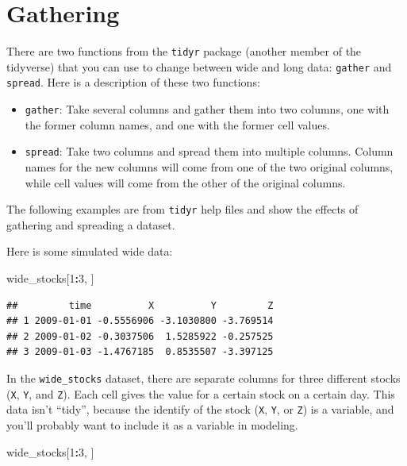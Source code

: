 \documentclass[]{book}
\makeatletter
\newenvironment{Shaded}{\begin{snugshade}}{\end{snugshade}}
\newcommand{\DecValTok}[1]{\textcolor[rgb]{0.00,0.00,0.81}{#1}}
\newcommand{\OperatorTok}[1]{\textcolor[rgb]{0.81,0.36,0.00}{\textbf{#1}}}
\newcommand{\NormalTok}[1]{#1}
\providecommand{\tightlist}{%
  \setlength{\itemsep}{0pt}\setlength{\parskip}{0pt}}
\newenvironment{kframe}{%
\medskip{}
\setlength{\fboxsep}{.8em}
 \def\at@end@of@kframe{}%
 \ifinner\ifhmode%
  \def\at@end@of@kframe{\end{minipage}}%
  \begin{minipage}{\columnwidth}%
 \fi\fi%
 \def\FrameCommand##1{\hskip\@totalleftmargin \hskip-\fboxsep
 \colorbox{shadecolor}{##1}\hskip-\fboxsep
     \hskip-\linewidth \hskip-\@totalleftmargin \hskip\columnwidth}%
 \MakeFramed {\advance\hsize-\width
   \@totalleftmargin\z@ \linewidth\hsize
   \@setminipage}}%
 {\par\unskip\endMakeFramed%
 \at@end@of@kframe}
\renewenvironment{Shaded}{\begin{kframe}}{\end{kframe}}
\theoremstyle{definition}
\theoremstyle{definition}
\theoremstyle{definition}
\theoremstyle{remark}
\makeatother
\begin{document}
\section{Gathering}\label{gathering}

There are two functions from the \texttt{tidyr} package (another member
of the tidyverse) that you can use to change between wide and long data:
\texttt{gather} and \texttt{spread}. Here is a description of these two
functions:

\begin{itemize}
\tightlist
\item
  \texttt{gather}: Take several columns and gather them into two
  columns, one with the former column names, and one with the former
  cell values.
\item
  \texttt{spread}: Take two columns and spread them into multiple
  columns. Column names for the new columns will come from one of the
  two original columns, while cell values will come from the other of
  the original columns.
\end{itemize}

The following examples are from \texttt{tidyr} help files and show the
effects of gathering and spreading a dataset.

Here is some simulated wide data:

\begin{Shaded}
\begin{Highlighting}[]
\NormalTok{wide_stocks[}\DecValTok{1}\OperatorTok{:}\DecValTok{3}\NormalTok{, ]}
\end{Highlighting}
\end{Shaded}

\begin{verbatim}
##         time          X          Y         Z
## 1 2009-01-01 -0.5556906 -3.1030800 -3.769514
## 2 2009-01-02 -0.3037506  1.5285922 -0.257525
## 3 2009-01-03 -1.4767185  0.8535507 -3.397125
\end{verbatim}

In the \texttt{wide\_stocks} dataset, there are separate columns for
three different stocks (\texttt{X}, \texttt{Y}, and \texttt{Z}). Each
cell gives the value for a certain stock on a certain day. This data
isn't ``tidy'', because the identify of the stock (\texttt{X},
\texttt{Y}, or \texttt{Z}) is a variable, and you'll probably want to
include it as a variable in modeling.

\begin{Shaded}
\begin{Highlighting}[]
\NormalTok{wide_stocks[}\DecValTok{1}\OperatorTok{:}\DecValTok{3}\NormalTok{, ]}
\end{Highlighting}
\end{Shaded}
\end{document}

